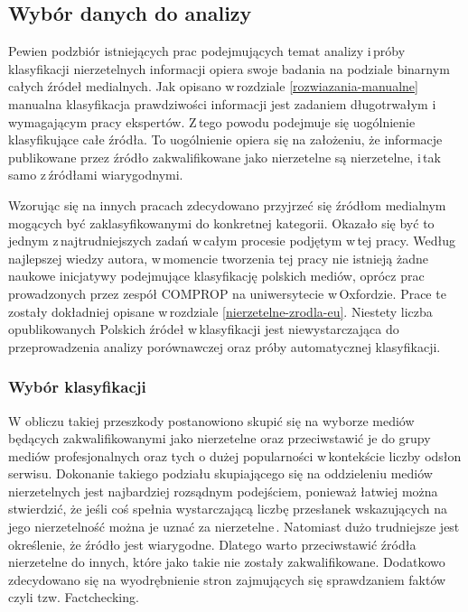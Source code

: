 
\subsection{Wybór danych do analizy} \label{wybor-danych}
Pewien podzbiór istniejących prac podejmujących temat analizy i\,próby klasyfikacji nierzetelnych informacji opiera swoje badania na podziale binarnym całych źródeł medialnych\cite{marchal2019junk}\cite{tacchini2017some}. Jak opisano w\,rozdziale \ref{rozwiazania-manualne} manualna klasyfikacja prawdziwości informacji jest zadaniem długotrwałym i\,wymagającym pracy ekspertów. Z\,tego powodu podejmuje się uogólnienie klasyfikujące całe źródła. To uogólnienie opiera się na założeniu, że informacje publikowane przez źródło zakwalifikowane jako nierzetelne są nierzetelne, i\,tak samo z\,źródłami wiarygodnymi. 
\par
Wzorując się na innych pracach zdecydowano przyjrzeć się źródłom medialnym mogących być zaklasyfikowanymi do konkretnej kategorii. Okazało się być to jednym z\,najtrudniejszych zadań w\,całym procesie podjętym w\,tej pracy. Według najlepszej wiedzy autora, w\,momencie tworzenia tej pracy nie istnieją żadne naukowe inicjatywy podejmujące klasyfikację polskich mediów, oprócz prac prowadzonych przez zespół COMPROP na uniwersytecie w\,Oxfordzie. Prace te zostały dokładniej opisane w\,rozdziale \ref{nierzetelne-zrodla-eu}. Niestety liczba opublikowanych Polskich źródeł w\,klasyfikacji jest niewystarczająca do przeprowadzenia analizy porównawczej oraz próby automatycznej klasyfikacji. 
\subsubsection{Wybór klasyfikacji}
W obliczu takiej przeszkody postanowiono skupić się na wyborze mediów będących zakwalifikowanymi jako nierzetelne oraz przeciwstawić je do grupy mediów profesjonalnych oraz tych o dużej popularności w\,kontekście liczby odsłon serwisu. Dokonanie takiego podziału skupiającego się na oddzieleniu mediów nierzetelnych jest najbardziej rozsądnym podejściem, ponieważ łatwiej można stwierdzić, że jeśli coś spełnia wystarczającą liczbę przesłanek wskazujących na jego nierzetelność można je uznać za nierzetelne\,\cite{shu2017fake}. Natomiast dużo trudniejsze jest określenie, że źródło jest wiarygodne. Dlatego warto przeciwstawić źródła nierzetelne do innych, które jako takie nie zostały zakwalifikowane. Dodatkowo zdecydowano się na wyodrębnienie stron zajmujących się sprawdzaniem faktów czyli tzw. Factchecking.
